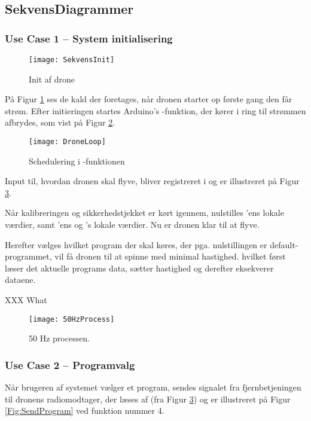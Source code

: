 \documentclass[Main]{subfiles}
\begin{document}
\subsection{SekvensDiagrammer}

\subsubsection{Use Case 1 -- System initialisering}

\begin{figure}[H]
\centering
\texttt{[image: SekvensInit]}
\caption{Init af drone}
\label{Fig:SekvInit}
\end{figure}

På Figur \ref{Fig:SekvInit} ses de kald der foretages, når dronen starter op første gang den får strøm.
Efter initieringen startes Arduino's -funktion, der kører i ring til strømmen afbrydes, som vist på Figur \ref{Fig:SekvDroneHz}.


\begin{figure}[htbp]
\centering
\texttt{[image: DroneLoop]}
\caption{Schedulering i -funktionen}
\label{Fig:SekvDroneHz}
\end{figure}

Input til, hvordan dronen skal flyve, bliver registreret i  og er illustreret på Figur \ref{Fig:50Hz}.

Når kalibreringen og sikkerhedstjekket er kørt igennem, nulstilles 'ens lokale værdier, samt 'ens og 's lokale værdier.
Nu er dronen klar til at flyve.

Herefter vælges hvilket program der skal køres, der pga. nulstillingen er default-programmet, vil få dronen til at spinne med minimal hastighed. hvilket først læser det aktuelle programs data, sætter hastighed og derefter eksekverer dataene.

XXX What 


\begin{figure}[H]
\centering
\texttt{[image: 50HzProcess]}
\caption{50 Hz processen. }
\label{Fig:50Hz}
\end{figure}




\newpage
\subsubsection{Use Case 2 -- Programvalg}
Når brugeren af systemet vælger et program, sendes signalet fra fjernbetjeningen til dronens radiomodtager, der læses af  (fra Figur \ref{Fig:50Hz}) og er illustreret på Figur \ref{Fig:SendProgram} ved funktion nummer 4.
\end{document}
